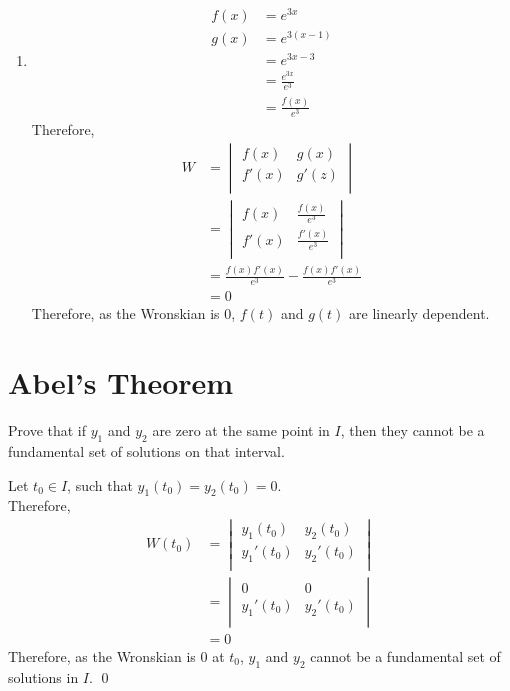 \documentclass[fleqn, a4paper, 11pt, oneside]{amsart}
\theoremstyle{definition}
\theoremstyle{theorem}
\begin{document}
\begin{solution}
\begin{enumerate}[leftmargin = *]
		\item
			\begin{align*}
				f(x) & = e^{3 x}             \\
				g(x) & = e^{3 (x - 1)}       \\
                                     & = e^{3 x - 3}         \\
                                     & = \frac{e^{3 x}}{e^3} \\
                                     & = \frac{f(x)}{e^3}
			\end{align*}
			Therefore,
			\begin{align*}
				W &=
					\begin{vmatrix}
						f(x)  & g(x)  \\
						f'(x) & g'(z) \\
					\end{vmatrix}\\
				  &=
					\begin{vmatrix}
						f(x)  & \frac{f(x)}{e^3}  \\
						f'(x) & \frac{f'(x)}{e^3} \\
					\end{vmatrix}\\
				  &= \frac{f(x) f'(x)}{e^3} - \frac{f(x) f'(x)}{e^3}\\
				  &= 0
			\end{align*}
			Therefore, as the Wronskian is $0$, $f(t)$ and $g(t)$ are linearly dependent.
	\end{enumerate}
\end{solution}

\part{Abel's Theorem}

\begin{question}
	Prove that if $y_1$ and $y_2$ are zero at the same point in $I$, then they cannot be a fundamental set of solutions on that interval.
\end{question}

\begin{solution}
	Let $t_0 \in I$, such that $y_1(t_0) = y_2(t_0) = 0$.\\
	Therefore,
	\begin{align*}
		W(t_0) &=
			\begin{vmatrix}
				y_1(t_0)    & y_2(t_0)    \\
				{y_1}'(t_0) & {y_2}'(t_0) \\
			\end{vmatrix}\\
		       &=
			\begin{vmatrix}
				0           & 0           \\
				{y_1}'(t_0) & {y_2}'(t_0) \\
			\end{vmatrix}\\
		       &= 0
	\end{align*}
	Therefore, as the Wronskian is $0$ at $t_0$, $y_1$ and $y_2$ cannot be a fundamental set of solutions in $I$.
	\qed
\end{solution}
\end{document}
